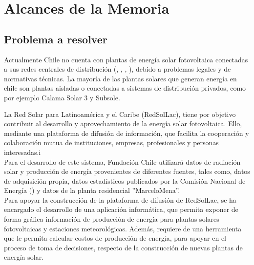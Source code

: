 \chapter{Alcances de la Memoria}
\label{alcances}

\section{Problema a resolver}

Actualmente Chile no cuenta con plantas de energía solar fotovoltaica conectadas a sus redes centrales de distribución (, , , ), debido a problemas legales y de normativas técnicas. La mayoría de las plantas solares que generan energía en chile son plantas aisladas o conectadas a sistemas de distribución privados, como por ejemplo Calama Solar 3\cite{plantaSolar:1} y Subsole\cite{subsole:2}.

La Red Solar para Latinoamérica y el Caribe (RedSolLac), tiene por objetivo contribuir al desarrollo y aprovechamiento de la energía solar fotovoltaica. Ello, mediante una plataforma de difusión de información, que facilita la cooperación y colaboración mutua de instituciones, empresas, profesionales y personas interesadas.i\\

Para el desarrollo de este sistema, Fundación Chile utilizará datos de radiación solar y producción de energía provenientes de diferentes fuentes, tales como, datos de adquisición propia, datos estadísticos publicados por la Comisión Nacional de Energía () y datos de la planta residencial ''MarceloMena''.\\

Para apoyar la construcción de la plataforma de difusión de RedSolLac, se ha encargado el desarrollo de una aplicación informática, que permita exponer de forma gráfica información de producción de energía para plantas solares fotovoltaicas y estaciones meteorológicas. Además, requiere de una herramienta que le permita calcular costos de producción de energía, para apoyar en el proceso de toma de decisiones, respecto de la construcción de nuevas plantas de energía solar.

